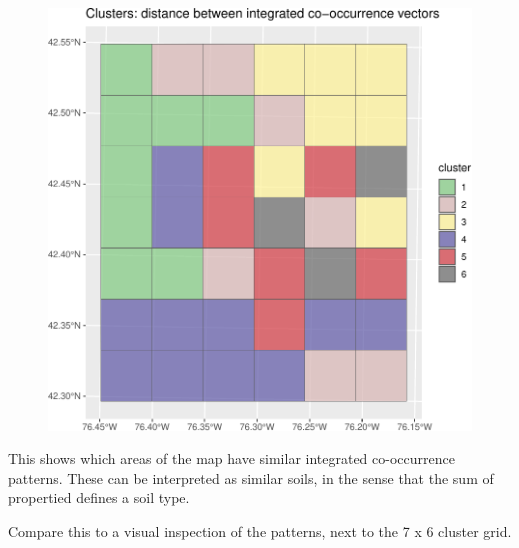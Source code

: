 \documentclass[
  letterpaper,
  DIV=11,
  numbers=noendperiod]{scrartcl}
\begin{document}
\begin{figure}[H]

{\centering \includegraphics{PatternAnalysisWorkshopTutorial_files/figure-pdf/incove.cluster.cut-1.pdf}

}

\end{figure}

This shows which areas of the map have similar integrated co-occurrence
patterns. These can be interpreted as similar soils, in the sense that
the sum of propertied defines a soil type.

Compare this to a visual inspection of the patterns, next to the 7 x 6
cluster grid.
\end{document}
